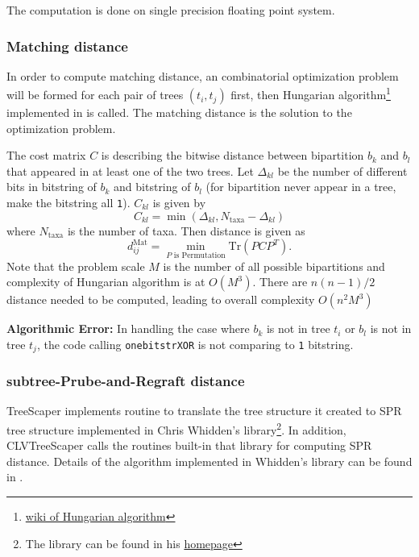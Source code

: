 \documentclass[11pt]{article}
\begin{document}
The computation is done on single precision floating point system.

\subsubsection{Matching distance} 

In order to compute matching distance, an combinatorial optimization problem will be formed for each pair of trees $(t_i, t_j)$ first, then Hungarian algorithm\footnote{\href{https://en.wikipedia.org/wiki/Hungarian_algorithm}{wiki of Hungarian algorithm}} implemented in \cite{stachniss2004c} is called. The matching distance is the solution to the optimization problem.

The cost matrix $C$ is describing the bitwise distance between bipartition $b_k$ and $b_l$ that appeared in at least one of the two trees. Let $\Delta_{kl}$ be the number of different bits in bitstring of $b_k$ and bitstring of $b_l$ (for bipartition never appear in a tree, make the bitstring all {\tt 1}). $C_{kl}$ is given by
\begin{equation}\label{eq:Mar-distance-cost}
	C_{kl} = \min(\Delta_{kl}, N_{\text{taxa}} - \Delta_{kl})
\end{equation}
where $ N_{\text{taxa}}$ is the number of taxa. 
Then distance is given as
\begin{equation}\label{eq:Mar-distance}
	d_{ij}^{\text{Mat}} = \min_{P \text{ is Permutation}} \text{Tr}(PCP^T).
\end{equation}
Note that the problem scale $M$ is the number of all possible bipartitions and complexity of Hungarian algorithm is at $O(M^3)$. There are $n(n-1)/2$ distance needed to be computed, leading to overall complexity $O(n^2M^3)$

{\bf Algorithmic Error:} In handling the case where $b_k$ is not in tree $t_i$ or $b_l$ is not in tree $t_j$, the code calling  {\tt onebitstrXOR} is not comparing to {\tt 1} bitstring.

\subsubsection{subtree-Prube-and-Regraft distance} 

TreeScaper implements routine to translate the tree structure it created to SPR tree structure implemented in Chris Whidden's library\footnote{The library can be found in his \href{https://web.cs.dal.ca/~whidden/}{homepage}}. In addition, CLVTreeScaper calls the routines built-in that library for computing SPR distance. Details of the algorithm implemented in Whidden's library can be found in \cite{whidden2018calculating}.
\end{document}
